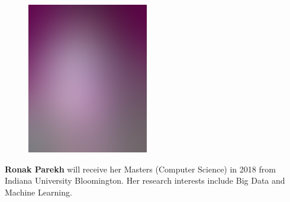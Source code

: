 \documentclass[9pt,twocolumn,twoside]{../../styles/osajnl}
\begin{document}
	\begin{minipage}[t][3.2cm][t]{1.0\columnwidth} %
	  \begin{figure}
	    \includegraphics[width=0.25\columnwidth]{images/alice_smith.eps}
	  \end{figure}
	  \noindent
	  {\bfseries Ronak Parekh} will receive her Masters (Computer
	  Science) in 2018 from Indiana University Bloomington. Her research
	  interests include Big Data and Machine Learning.
	\end{minipage}
        \endgroup
        
\end{document}
